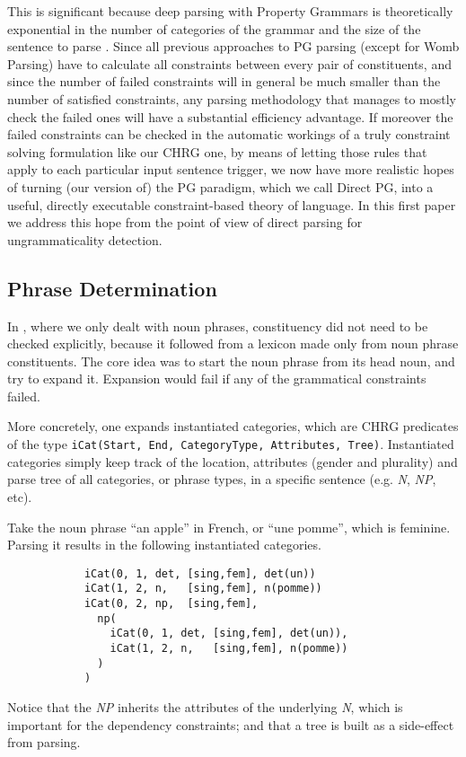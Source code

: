 \documentclass{llncs}
\newcommand{\NP}{\textit{NP}\xspace}
\newcommand{\N}{\textit{N}\xspace}
\begin{document}
This is significant because deep parsing with Property Grammars is theoretically exponential in the number of categories of the grammar and the size of the sentence to parse \cite{vanRullen2005}. Since all previous approaches to PG parsing (except for Womb Parsing) have to calculate all constraints between every pair of constituents, and since the number of failed constraints will in general be much smaller than the number of satisfied constraints,  any parsing methodology that manages to mostly check the failed ones will have a substantial efficiency advantage. If moreover the failed constraints can be checked in the automatic workings of a truly constraint solving formulation like our CHRG one, by means of letting those rules that apply to each particular input sentence trigger, we now have more realistic hopes of turning (our version of) the PG paradigm, which we  call Direct PG, into a useful, directly executable constraint-based theory of language. In this first paper we address this hope from the point of view of direct parsing for ungrammaticality detection.


\subsection{Phrase Determination}

In \cite {DM12}, where we only dealt with noun phrases, constituency did not need to be checked explicitly, because it followed from a lexicon made only from noun phrase constituents. The core idea was to start the noun phrase from its head noun, and try to expand it. Expansion would fail if any of the grammatical constraints failed.

More concretely, one expands instantiated categories, which are CHRG predicates of the type \texttt{iCat(Start, End, CategoryType, Attributes, Tree)}. Instantiated categories simply keep track of the location, attributes (gender and plurality) and parse tree of all categories, or phrase types, in a specific sentence (e.g. \N, \NP, etc).

\begin{example} \label{ex:icat} Take the noun phrase ``an apple'' in French, or ``une pomme'', which is feminine. Parsing it results in the following instantiated categories.
\begin{verbatim}
            iCat(0, 1, det, [sing,fem], det(un))
            iCat(1, 2, n,   [sing,fem], n(pomme))
            iCat(0, 2, np,  [sing,fem],
              np(
                iCat(0, 1, det, [sing,fem], det(un)),
                iCat(1, 2, n,   [sing,fem], n(pomme))
              )
            )
\end{verbatim}

Notice that the \NP inherits the attributes of the underlying \N, which is important for the dependency constraints; and that a tree is built as a side-effect from parsing.\end{example}
\end{document}

